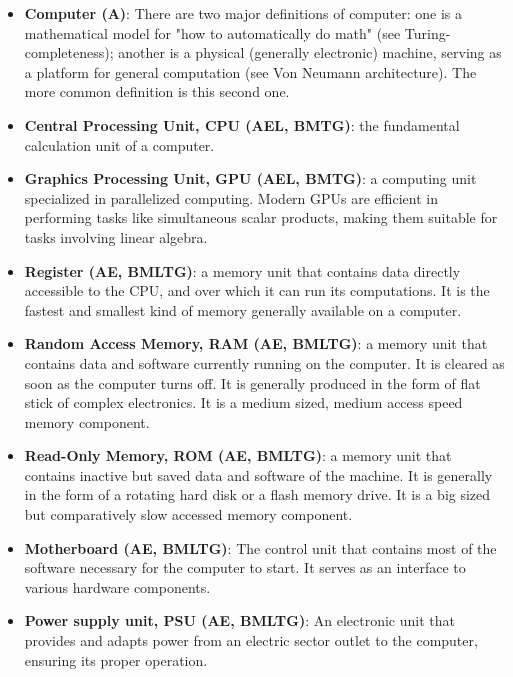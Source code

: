 \documentclass{article}
\begin{document}
\begin{itemize}

	\item \textbf{Computer (A)}: There are two major definitions of computer: one is a mathematical model for "how to automatically do math" (see Turing-completeness); another is a physical (generally electronic) machine, serving as a platform for general computation (see Von Neumann architecture). The more common definition is this second one.

	\item \textbf{Central Processing Unit, CPU (AEL, BMTG)}: the fundamental calculation unit of a computer.

	\item \textbf{Graphics Processing Unit, GPU (AEL, BMTG)}: a computing unit specialized in parallelized computing. Modern GPUs are efficient in performing tasks like simultaneous scalar products, making them suitable for tasks involving linear algebra.

	\item \textbf{Register (AE, BMLTG)}: a memory unit that contains data directly accessible to the CPU, and over which it can run its computations. It is the fastest and smallest kind of memory generally available on a computer.

	\item \textbf{Random Access Memory, RAM (AE, BMLTG)}: a memory unit that contains data and software currently running on the computer. It is cleared as soon as the computer turns off. It is generally produced in the form of flat stick of complex electronics. It is a medium sized, medium access speed memory component.

	\item \textbf{Read-Only Memory, ROM (AE, BMLTG)}: a memory unit that contains inactive but saved data and software of the machine. It is generally in the form of a rotating hard disk or a flash memory drive. It is a big sized but comparatively slow accessed memory component.

	\item \textbf{Motherboard (AE, BMLTG)}: The control unit that contains most of the software necessary for the computer to start. It serves as an interface to various hardware components.

	\item \textbf{Power supply unit, PSU (AE, BMLTG)}: An electronic unit that provides and adapts power from an electric sector outlet to the computer, ensuring its proper operation.


\end{itemize}
\end{document}
